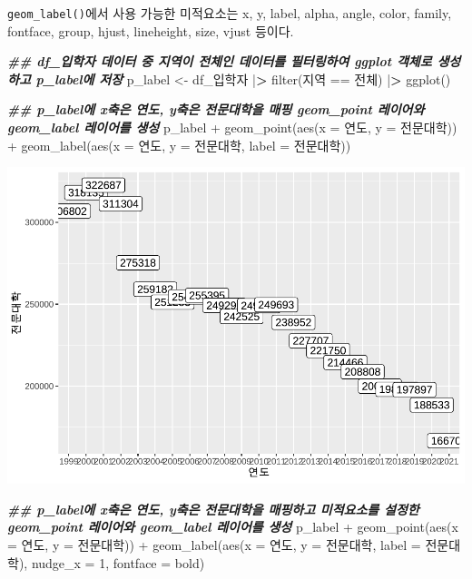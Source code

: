 \documentclass[
]{article}
\newenvironment{Shaded}{\begin{snugshade}}{\end{snugshade}}
\newcommand{\AttributeTok}[1]{\textcolor[rgb]{0.77,0.63,0.00}{#1}}
\newcommand{\DecValTok}[1]{\textcolor[rgb]{0.00,0.00,0.81}{#1}}
\newcommand{\DocumentationTok}[1]{\textcolor[rgb]{0.56,0.35,0.01}{\textbf{\textit{#1}}}}
\newcommand{\ErrorTok}[1]{\textcolor[rgb]{0.64,0.00,0.00}{\textbf{#1}}}
\newcommand{\FunctionTok}[1]{\textcolor[rgb]{0.00,0.00,0.00}{#1}}
\newcommand{\NormalTok}[1]{#1}
\newcommand{\OtherTok}[1]{\textcolor[rgb]{0.56,0.35,0.01}{#1}}
\newcommand{\SpecialCharTok}[1]{\textcolor[rgb]{0.00,0.00,0.00}{#1}}
\newcommand{\StringTok}[1]{\textcolor[rgb]{0.31,0.60,0.02}{#1}}
\begin{document}
\texttt{geom\_label()}에서 사용 가능한 미적요소는 x, y, label, alpha, angle, color, family, fontface, group, hjust, lineheight, size, vjust 등이다.

\begin{Shaded}
\begin{Highlighting}[]
\DocumentationTok{\#\#  df\_입학자 데이터 중 지역이 전체인 데이터를 필터링하여 ggplot 객체로 생성하고 p\_label에 저장}
\NormalTok{p\_label }\OtherTok{\textless{}{-}}\NormalTok{ df\_입학자 }\SpecialCharTok{|}\ErrorTok{\textgreater{}} \FunctionTok{filter}\NormalTok{(지역 }\SpecialCharTok{==} \StringTok{\textquotesingle{}전체\textquotesingle{}}\NormalTok{) }\SpecialCharTok{|}\ErrorTok{\textgreater{}}
  \FunctionTok{ggplot}\NormalTok{()}

\DocumentationTok{\#\#  p\_label에 x축은 연도, y축은 전문대학을 매핑 geom\_point 레이어와 geom\_label 레이어를 생성}
\NormalTok{p\_label }\SpecialCharTok{+}
  \FunctionTok{geom\_point}\NormalTok{(}\FunctionTok{aes}\NormalTok{(}\AttributeTok{x =}\NormalTok{ 연도, }\AttributeTok{y =}\NormalTok{ 전문대학)) }\SpecialCharTok{+}
  \FunctionTok{geom\_label}\NormalTok{(}\FunctionTok{aes}\NormalTok{(}\AttributeTok{x =}\NormalTok{ 연도, }\AttributeTok{y =}\NormalTok{ 전문대학, }\AttributeTok{label =}\NormalTok{ 전문대학))}
\end{Highlighting}
\end{Shaded}

\includegraphics{chap3_files/figure-latex/unnamed-chunk-32-1.pdf}

\begin{Shaded}
\begin{Highlighting}[]
\DocumentationTok{\#\#  p\_label에 x축은 연도, y축은 전문대학을 매핑하고 미적요소를 설정한 geom\_point 레이어와 geom\_label 레이어를 생성}
\NormalTok{p\_label }\SpecialCharTok{+}
  \FunctionTok{geom\_point}\NormalTok{(}\FunctionTok{aes}\NormalTok{(}\AttributeTok{x =}\NormalTok{ 연도, }\AttributeTok{y =}\NormalTok{ 전문대학)) }\SpecialCharTok{+}
  \FunctionTok{geom\_label}\NormalTok{(}\FunctionTok{aes}\NormalTok{(}\AttributeTok{x =}\NormalTok{ 연도, }\AttributeTok{y =}\NormalTok{ 전문대학, }\AttributeTok{label =}\NormalTok{ 전문대학), }\AttributeTok{nudge\_x =} \DecValTok{1}\NormalTok{, }\AttributeTok{fontface =} \StringTok{\textquotesingle{}bold\textquotesingle{}}\NormalTok{)}
\end{Highlighting}
\end{Shaded}
\end{document}
